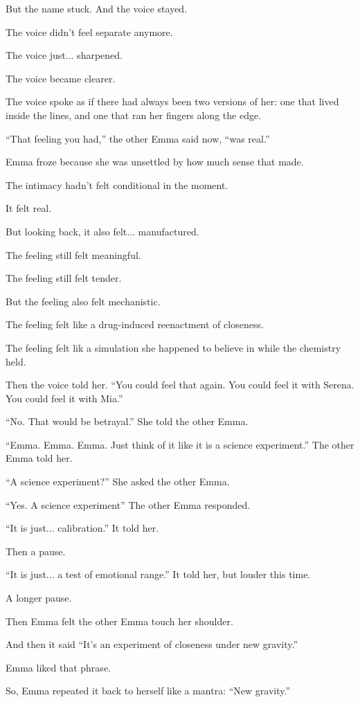 But the name stuck. And the voice stayed. 

The voice didn’t feel separate anymore.  

The voice just... sharpened. 

The voice became clearer. 

The voice spoke as if there had always been two versions of her: one that lived inside the lines, 
and one that ran her fingers along the edge.

``That feeling you had,'' the other Emma said now, ``was real.''

Emma froze because she was unsettled by how much sense that made.

The intimacy hadn’t felt conditional in the moment. 

It felt real. 

But looking back, it also felt... manufactured. 

The feeling still felt meaningful.

The feeling still felt tender. 

But the feeling also felt mechanistic.

The feeling felt like a drug-induced reenactment of closeness. 

The feeling felt lik a simulation she happened to believe in while the chemistry held.

Then the voice told her. ``You could feel that again. You could feel it with Serena.  
You could feel it with Mia.''

``No. That would be betrayal.'' She told the other Emma.

``Emma. Emma. Emma. Just think of it like it is a science experiment.'' The other Emma told her.

``A science experiment?'' She asked the other Emma.

``Yes. A science experiment'' The other Emma responded.

``It is just... calibration.'' It told her.

Then a pause.

``It is just... a test of emotional range.'' It told her, but louder this time.

A longer pause.

Then Emma felt the other Emma touch her shoulder. 

And then it said
``It's an experiment of closeness under new gravity.''

Emma liked that phrase. 

So, Emma repeated it back to herself like a mantra: ``New gravity.''

